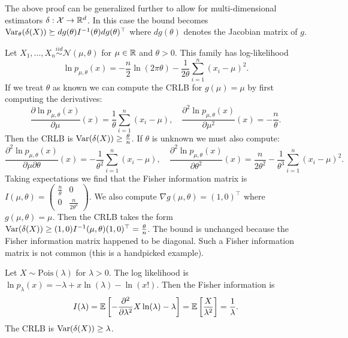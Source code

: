 \begin{remark}
	The above proof can be generalized further to allow for multi-dimensional estimators $\delta: \mathcal X \to \mathbb{R}^d$. In this case the bound becomes $\operatorname{Var}_\theta(\delta(X)) \succeq dg(\theta) {I^{-1}(\theta)} dg(\theta)^\top$ where $dg(\theta)$ denotes the Jacobian matrix of $g$.
\end{remark}


\begin{example}
	Let $X_1, \dots, X_n \overset{iid}{\sim} \mathcal N(\mu, \theta)$ for $\mu \in \mathbb{R}$ and $\theta > 0$. This family has log-likelihood \[
		\ln p_{\mu, \theta}(x) = -\frac{n}{2} \ln(2\pi \theta) - \frac{1}{2\theta}\sum_{i=1}^n (x_i - \mu)^2 .
	\] If we treat $\theta$ as known we can compute the CRLB for $g(\mu) = \mu$ by first computing the derivatives: \[
		\frac{\partial \ln p_{\mu, \theta}(x)}{\partial \mu}(x) = \frac{1}{\theta} \sum_{i=1}^n (x_i - \mu), \quad
		\frac{\partial^2 \ln p_{\mu, \theta}(x)}{\partial \mu^2}(x) = -\frac{n}{\theta}.
	\] Then the CRLB is $\operatorname{Var}(\delta(X)) \ge \frac{\theta}{n}$. If $\theta$ is unknown we must also compute: \[
		\frac{\partial^2 \ln p_{\mu, \theta}(x)}{\partial \mu\partial \theta}(x) = -\frac{1}{\theta^2} \sum_{i=1}^n (x_i - \mu), \quad 
		\frac{\partial^2 \ln p_{\mu, \theta}(x)}{\partial \theta^2}(x) = \frac{n}{2\theta^2} - \frac{1}{\theta^3} \sum_{i=1}^n (x_i - \mu)^2.
	\] Taking expectations we find that the Fisher information matrix is \(
		I(\mu, \theta) = \begin{pmatrix}
		\frac{n}{\theta} & 0 \\
		0 & \frac{n}{2\theta^2}
		\end{pmatrix}.
	\) We also compute $\nabla g(\mu, \theta) = (1, 0)^\top$ where $g(\mu, \theta) = \mu$. Then the CRLB takes the form $\operatorname{Var}(\delta(X)) \ge (1, 0) I^{-1}(\mu, \theta) (1, 0)^\top = \frac{\theta}{n}$. The bound is unchanged because the Fisher information matrix happened to be diagonal. Such a Fisher information matrix is not common (this is a handpicked example).
\end{example}

\begin{example}
	Let $X \sim \text{Pois}(\lambda)$ for $\lambda > 0$. The log likelihood is $\ln p_\lambda(x) = -\lambda + x\ln(\lambda) - \ln(x!)$. Then the Fisher information is \[
		I(\lambda) = \mathbb{E}\left[-\frac{\partial^2}{\partial\lambda^2} X\ln(\lambda) - \lambda \right] = \mathbb{E}\left[\frac{X}{\lambda^2}\right] = \frac{1}{\lambda}.
	\] The CRLB is $\operatorname{Var}(\delta(X)) \ge \lambda$.
\end{example}

